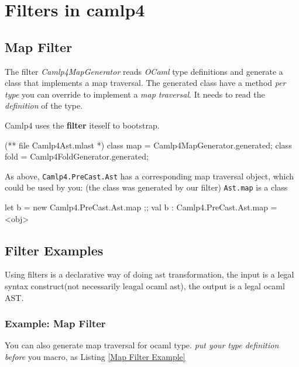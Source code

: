 \section{Filters in camlp4}


\subsection{Map Filter}
\label{transform}


The filter \emph{Camlp4MapGenerator} reads \emph{OCaml} type
definitions and generate a class that implements a map traversal.  The
generated class have a method \textit{per type} you can override to
implement a \textit{map traversal}. It needs to read the
\textit{definition} of the type.

Camlp4 uses the \textbf{filter} iteself to bootstrap.


\begin{ocamlcode}
(** file Camlp4Ast.mlast *)
class map = Camlp4MapGenerator.generated;
class fold = Camlp4FoldGenerator.generated;
\end{ocamlcode}

As above, \verb|Camlp4.PreCast.Ast| has a corresponding map traversal
object, which could be used by you: (the class was generated by our
filter) \verb|Ast.map| is a class

\begin{ocamlcode}
let b = new Camlp4.PreCast.Ast.map ;;
val b : Camlp4.PreCast.Ast.map = <obj>
\end{ocamlcode}



\subsection{Filter Examples}
Using filters is a declarative way of doing ast transformation, the
input is a legal syntax construct(not necessarily leagal ocaml ast),
the output is a legal ocaml AST.

\subsubsection{Example: Map Filter}
You can also generate map traversal for ocaml type. \textit{put your
  type definition before} you macro, as Listing \ref{Map Filter
  Example}

\inputminted[fontsize=\scriptsize,bgcolor=lightlightgray]
{ocaml}{code/camlp4/filters/ast_map/ast_map.ml}

